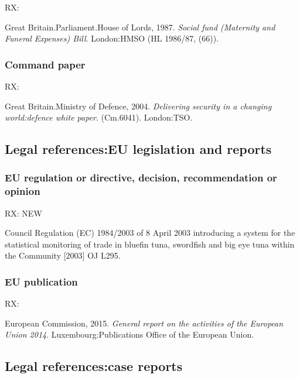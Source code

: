 RX: \cite{gb.hl1986/87-66}

Great Britain.\@ Parliament.\@ House of Lords, 1987. \emph{Social fund (Maternity and Funeral Expenses) Bill}. London:\@ HMSO (HL 1986/87, (66)).



\subsubsection*{Command paper}

RX: \cite{gb.cm6041}

Great Britain.\@ Ministry of Defence, 2004. \emph{Delivering security in a changing world:\@ defence white paper}. (Cm.\@ 6041). London:\@ TSO.



\subsection{Legal references:\@ EU legislation and reports}


\subsubsection*{EU regulation or directive, decision, recommendation or opinion}

RX: \cite{eu.dir1984/2003} NEW

Council Regulation (EC) 1984/2003 of 8 April 2003 introducing a system for the statistical monitoring of trade in bluefin tuna, swordfish and big eye tuna within the Community [2003] OJ L295.




\subsubsection*{EU publication}

RX: \cite{ec2015gra}

European Commission, 2015. \emph{General report on the activities of the European Union 2014}. Luxembourg:\@ Publications Office of the European Union.



\subsection{Legal references:\@ case reports}

